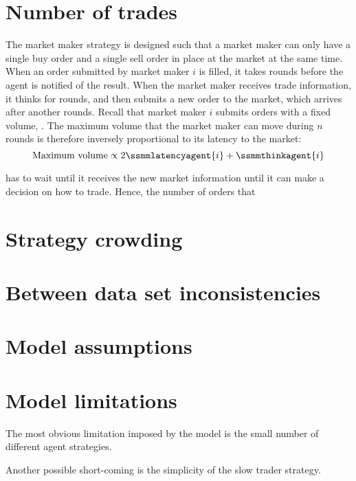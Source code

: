 \section{Number of trades}
The market maker strategy is designed such that a market maker can only have a single buy order and a single sell order in place at the market at the same time. When an order submitted by market maker $i$ is filled, it takes  rounds before the agent is notified of the result. When the market maker receives trade information, it thinks for  rounds, and then submits a new order to the market, which arrives after another  rounds. Recall that market maker $i$ submits orders with a fixed volume, . The maximum volume that the market maker can move during $n$ rounds is therefore inversely proportional to its latency to the market:
\[\text{Maximum volume} \propto 2\ssmmlatencyagent{i} + \ssmmthinkagent{i}\]

has to wait until it receives the new market information until it can make a decision on how to trade. Hence, the number of orders that 

\section{Strategy crowding}

\section{Between data set inconsistencies}

\section{Model assumptions}

\section{Model limitations}
The most obvious limitation imposed by the model is the small number of different agent strategies.

Another possible short-coming is the simplicity of the slow trader strategy. 